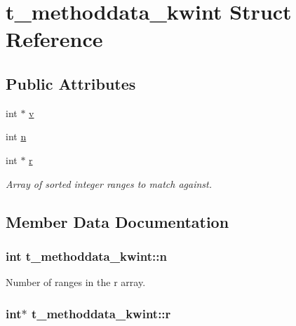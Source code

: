 \hypertarget{structt__methoddata__kwint}{\section{t\-\_\-methoddata\-\_\-kwint \-Struct \-Reference}
\label{structt__methoddata__kwint}
}
\subsection*{\-Public \-Attributes}
\begin{DoxyCompactItemize}
\item 
int $\ast$ \hyperlink{structt__methoddata__kwint_a3da96c2bfd6a3309985ee374a7d7fa64}{v}
\item 
int \hyperlink{structt__methoddata__kwint_ae172293bd16761c56a6856b25a43afa3}{n}
\item 
int $\ast$ \hyperlink{structt__methoddata__kwint_aa39284c271e999c60ab7a551dfa24345}{r}
\begin{DoxyCompactList}\small\item\em \-Array of sorted integer ranges to match against. \end{DoxyCompactList}\end{DoxyCompactItemize}


\subsection{\-Member \-Data \-Documentation}
\hypertarget{structt__methoddata__kwint_ae172293bd16761c56a6856b25a43afa3}{
\subsubsection[{n}]{\setlength{\rightskip}{0pt plus 5cm}int {\bf t\-\_\-methoddata\-\_\-kwint\-::n}}}\label{structt__methoddata__kwint_ae172293bd16761c56a6856b25a43afa3}
\-Number of ranges in the {\ttfamily r} array. \hypertarget{structt__methoddata__kwint_aa39284c271e999c60ab7a551dfa24345}{
\subsubsection[{r}]{\setlength{\rightskip}{0pt plus 5cm}int$\ast$ {\bf t\-\_\-methoddata\-\_\-kwint\-::r}}}\label{structt__methoddata__kwint_aa39284c271e999c60ab7a551dfa24345}


